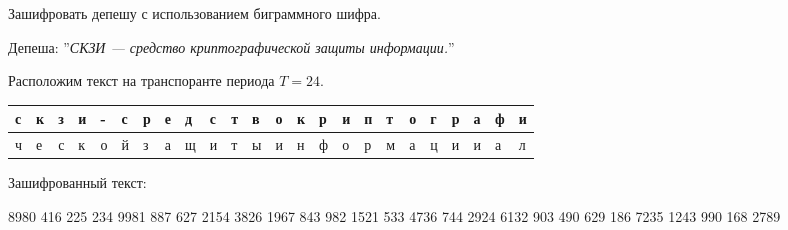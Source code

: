 \begin{problem}
  Зашифровать депешу с использованием биграммного шифра.
  
  Депеша: ''\textit{СКЗИ — средство криптографической защиты информации.}''
\end{problem}

\begin{solution}
  Расположим текст на транспоранте периода $T=24$.

  \begin{table}[H]
    \centering
    \begin{tabular}{|l|l|l|l|l|l|l|l|l|l|l|l|l|l|l|l|l|l|l|l|l|l|l|l|}
      \hline
      с&к&з&и&-&с&р&е&д&с&т&в&о&к&р&и&п&т&о&г&р&а&ф&и \\ \hline
      ч&е&с&к&о&й&з&а&щ&и&т&ы&и&н&ф&о&р&м&а&ц&и&и&а&л \\ \hline
    \end{tabular}
  \end{table}

  Зашифрованный текст:
  \begin{addmargin}[2cm]{1cm}
    8980 416 225 234 9981 887 627 2154 3826 1967 843 982 1521 533 4736 744 2924
    6132 903 490 629 186 7235 1243 990 168 2789
  \end{addmargin}
\end{solution}
